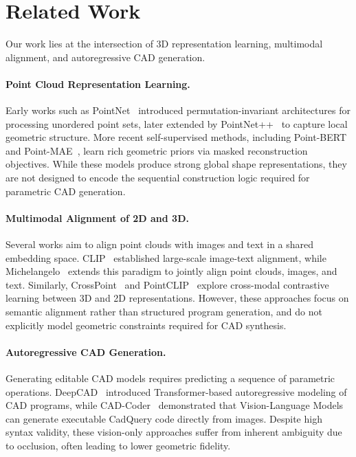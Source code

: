 \documentclass{article}
\begin{document}
\section{Related Work}
Our work lies at the intersection of 3D representation learning, multimodal alignment, and autoregressive CAD generation.

\paragraph{Point Cloud Representation Learning.}
Early works such as PointNet~\cite{qi2017pointnet} introduced permutation-invariant architectures for processing unordered point sets, later extended by PointNet++~\cite{qi2017pointnet++} to capture local geometric structure. More recent self-supervised methods, including Point-BERT~\cite{yu2022point} and Point-MAE~\cite{pang2023masked}, learn rich geometric priors via masked reconstruction objectives. While these models produce strong global shape representations, they are not designed to encode the sequential construction logic required for parametric CAD generation.

\paragraph{Multimodal Alignment of 2D and 3D.}
Several works aim to align point clouds with images and text in a shared embedding space. CLIP~\cite{radford2021clip} established large-scale image-text alignment, while Michelangelo~\cite{zhao2023michelangelo} extends this paradigm to jointly align point clouds, images, and text. Similarly, CrossPoint~\cite{afham2022crosspoint} and PointCLIP~\cite{zhang2022pointclip} explore cross-modal contrastive learning between 3D and 2D representations. However, these approaches focus on semantic alignment rather than structured program generation, and do not explicitly model geometric constraints required for CAD synthesis.

\paragraph{Autoregressive CAD Generation.}
Generating editable CAD models requires predicting a sequence of parametric operations. DeepCAD~\cite{wu2021deepcad} introduced Transformer-based autoregressive modeling of CAD programs, while CAD-Coder~\cite{cadcoder} demonstrated that Vision-Language Models can generate executable CadQuery code directly from images. Despite high syntax validity, these vision-only approaches suffer from inherent ambiguity due to occlusion, often leading to lower geometric fidelity.
\end{document}
